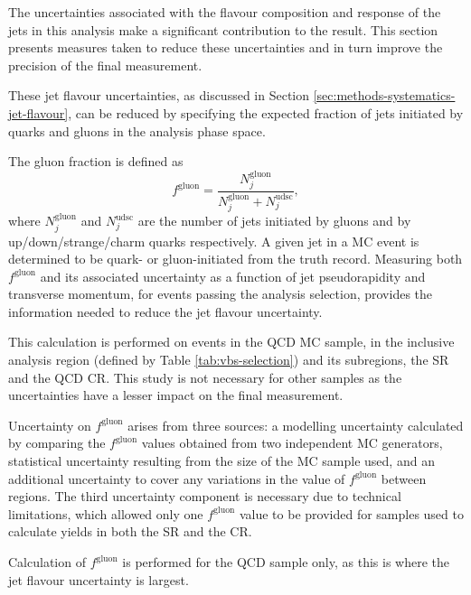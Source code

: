 \newcommand\fgluon{$f^\text{gluon}$\xspace}

The uncertainties associated with the flavour composition and response of the
jets in this analysis make a significant contribution to the result. This
section presents measures taken to reduce these uncertainties and in turn
improve the precision of the final measurement.

These jet flavour uncertainties, as discussed in Section
\ref{sec:methods-systematics-jet-flavour}, can be reduced by specifying the
expected fraction of jets initiated by quarks and gluons in the analysis phase
space.

The gluon fraction is defined as
%
\begin{equation*}
  f^\text{gluon} = \frac{ N_j^\text{gluon} }
                        { N_j^\text{gluon} + N_j^\text{udsc}},
\end{equation*}
%
where $N_j^\mathrm{gluon}$ and $N_j^\mathrm{udsc}$ are the number of jets
initiated by gluons and by up/down/strange/charm quarks respectively. A given
jet in a \ac{MC} event is determined to be quark- or gluon-initiated from the
truth record.
Measuring both \fgluon and its associated uncertainty as a function of jet
pseudorapidity and transverse momentum, for events passing the analysis
selection, provides the information needed to reduce the jet flavour
uncertainty.

This calculation is performed on events in the \ac{QCD} \Zy \ac{MC} sample, in
the inclusive analysis region (defined by Table \ref{tab:vbs-selection}) and its
subregions, the \ac{SR} and the \ac{QCD} \ac{CR}. This study is not necessary
for other samples as the uncertainties have a lesser impact on the final
measurement.

Uncertainty on \fgluon arises from three sources: a modelling uncertainty
calculated by comparing the \fgluon values obtained from two independent \ac{MC}
generators, statistical uncertainty resulting from the size of the \ac{MC}
sample used, and an additional uncertainty to cover any variations in the value
of \fgluon between regions. The third uncertainty component is necessary due to
technical limitations, which allowed only one \fgluon value to be provided for
samples used to calculate yields in both the \ac{SR} and the \ac{CR}.

Calculation of \fgluon is performed for the \ac{QCD} \Zy sample only, as this is
where the jet flavour uncertainty is largest.

